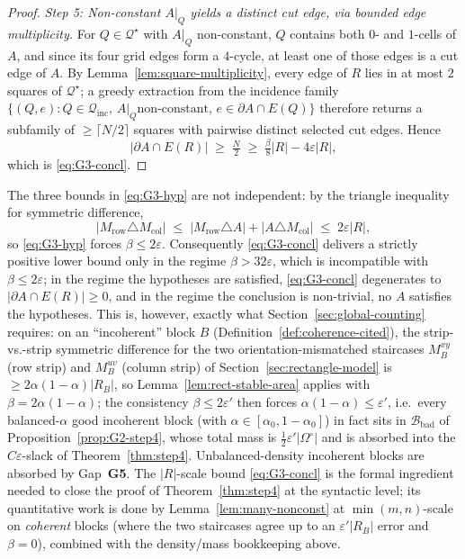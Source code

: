 \begin{proof}
\smallskip\noindent\emph{Step 5: Non-constant $A|_Q$ yields a distinct
cut edge, via bounded edge multiplicity.}
For $Q\in\mathcal Q^\star$ with $A|_Q$ non-constant, $Q$ contains both
$0$- and $1$-cells of $A$, and since its four grid edges form a
$4$-cycle, at least one of those edges is a cut edge of $A$. By
Lemma~\ref{lem:square-multiplicity}, every edge of $R$ lies in at most
$2$ squares of $\mathcal Q^\star$; a greedy extraction from the
incidence family $\{(Q,e):Q\in\mathcal Q_{\mathrm{inc}},\,A|_Q\text{
non-constant},\,e\in\partial A\cap E(Q)\}$ therefore returns a
subfamily of $\ge\lceil N/2\rceil$ squares with pairwise distinct
selected cut edges. Hence
\[
|\partial A\cap E(R)|
\;\ge\;\tfrac{N}{2}
\;\ge\;\tfrac{\beta}{8}|R|-4\varepsilon|R|,
\]
which is \eqref{eq:G3-concl}.
\end{proof}

\begin{remark}
\label{rem:G3-vacuity}
The three bounds in \eqref{eq:G3-hyp} are not independent: by the
triangle inequality for symmetric difference,
\[
|M_{\mathrm{row}}\triangle M_{\mathrm{col}}|
\;\le\;|M_{\mathrm{row}}\triangle A|+|A\triangle M_{\mathrm{col}}|
\;\le\;2\varepsilon|R|,
\]
so \eqref{eq:G3-hyp} forces $\beta\le2\varepsilon$. Consequently
\eqref{eq:G3-concl} delivers a strictly positive lower bound only in
the regime $\beta>32\varepsilon$, which is incompatible with
$\beta\le2\varepsilon$; in the regime the hypotheses are satisfied,
\eqref{eq:G3-concl} degenerates to $|\partial A\cap E(R)|\ge0$, and in
the regime the conclusion is non-trivial, no $A$ satisfies the
hypotheses. This is, however, exactly what
Section~\ref{sec:global-counting} requires: on an ``incoherent'' block
$B$ (Definition~\ref{def:coherence-cited}), the
strip-vs.-strip symmetric difference for the two orientation-mismatched
staircases $M_B^{xy}$ (row strip) and $M_B^{uv}$ (column strip) of
Section~\ref{sec:rectangle-model} is $\ge2\alpha(1-\alpha)|R_B|$, so
Lemma~\ref{lem:rect-stable-area} applies with $\beta=2\alpha(1-\alpha)$;
the consistency $\beta\le2\varepsilon'$ then forces
$\alpha(1-\alpha)\le\varepsilon'$, i.e.\ every balanced-$\alpha$ good
incoherent block (with $\alpha\in[\alpha_0,1-\alpha_0]$) in fact sits
in $\mathcal B_{\mathrm{bad}}$ of Proposition~\ref{prop:G2-step4}, whose
total mass is $\tfrac12\varepsilon'|\Omega^\circ|$ and is absorbed into
the $C\varepsilon$-slack of Theorem~\ref{thm:step4}. Unbalanced-density
incoherent blocks are absorbed by Gap~\textbf{G5}. The
$|R|$-scale bound \eqref{eq:G3-concl} is the formal ingredient needed
to close the proof of Theorem~\ref{thm:step4} at the syntactic level;
its quantitative work is done by Lemma~\ref{lem:many-nonconst} at
$\min(m,n)$-scale on \emph{coherent} blocks (where the two staircases
agree up to an $\varepsilon'|R_B|$ error and $\beta=0$), combined with
the density/mass bookkeeping above.
\end{remark}

